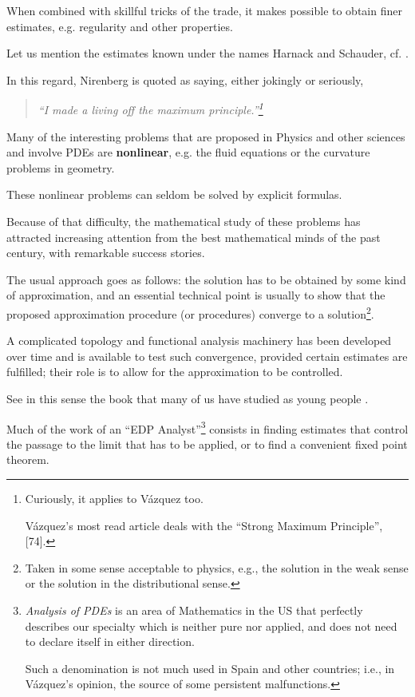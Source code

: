\documentclass{article}
\begin{document}
When combined with skillful tricks of the trade, it makes possible to obtain finer estimates, e.g. regularity and other properties.

Let us mention the estimates known under the names Harnack and Schauder, cf. \cite{Evans2010, Gilbarg_Trudinger2001}.

In this regard, Nirenberg is quoted as saying, either jokingly or seriously,
\begin{quotation}\it
	``I made a living off the maximum principle.''\footnote{Curiously, it applies to V\'azquez too.
		
		V\'azquez's most read article deals with the ``Strong Maximum Principle'', [74].}
\end{quotation}
Many of the interesting problems that are proposed in Physics and other sciences and involve PDEs are \textbf{nonlinear}, e.g. the fluid equations or the curvature problems in geometry.

These nonlinear problems can seldom be solved by explicit formulas.

Because of that difficulty, the mathematical study of these problems has attracted increasing attention from the best mathematical minds of the past century, with remarkable success stories.

The usual approach goes as follows: the solution has to be obtained by some kind of approximation, and an essential technical point is usually to show that the proposed approximation procedure (or procedures) converge to a solution\footnote{Taken in some sense acceptable to physics, e.g., the solution in the weak sense or the solution in the distributional sense.}.

A complicated topology and functional analysis machinery has been developed over time and is available to test such convergence, provided certain estimates are fulfilled; their role is to allow for the approximation to be controlled.

See in this sense the book that many of us have studied as young people \cite{Brezis2011}.

%
Much of the work of an ``EDP Analyst''\footnote{\textit{Analysis of PDEs} is an area of Mathematics in the US that perfectly describes our specialty which is neither pure nor applied, and does not need to declare itself in either direction.
	
	Such a denomination is not much used in Spain and other countries; i.e., in V\'azquez's opinion, the source of some persistent malfunctions.} consists in finding estimates that control the passage to the limit that has to be applied, or to find a convenient fixed point theorem.
\end{document}
